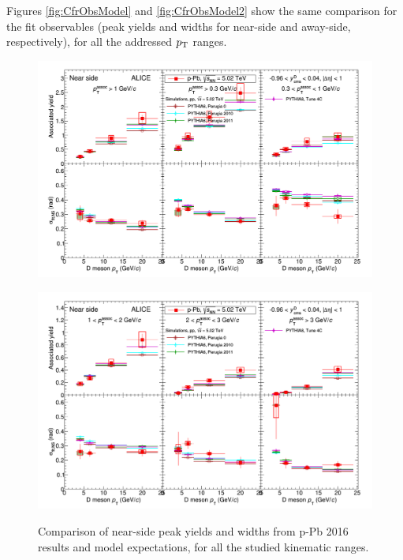 Figures \ref{fig:CfrObsModel} and \ref{fig:CfrObsModel2} show the same comparison for the fit observables (peak yields and widths for near-side and away-side, respectively), for all the addressed $p_{\rm T}$ ranges. 

\begin{figure}[!htbp]
\centering
{\includegraphics[width=1.3\linewidth, angle=90]{figures/CfrPPandModels/ComparePPbtoMCFitResults.png}}
\end{figure}
\begin{figure}[!htbp]
\centering
{\includegraphics[width=1.3\linewidth, angle=90]{figures/CfrPPandModels/ComparePPbtoMCFitResults_2.png}}
\caption{Comparison of near-side peak yields and widths from p-Pb 2016 results and model expectations, for all the studied kinematic ranges.}
\label{fig:CfrAverageModel}
\end{figure}

